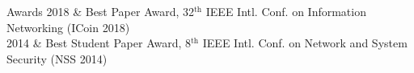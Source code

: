 %
%
%

\begin{rubriquetableau}[\offsetintab]{Awards}
  2018  & Best Paper Award, 32$^\text{th}$ IEEE Intl. Conf. on Information Networking (ICoin 2018)\hfill{}\\
  2014  & Best Student Paper Award, 8$^\text{th}$ IEEE Intl. Conf. on Network and System Security (NSS 2014)\hfill{}\\
\end{rubriquetableau}

%
